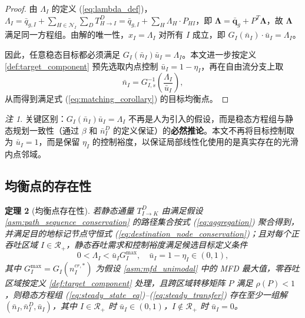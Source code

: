 \documentclass[a4paper,12pt]{article}
\theoremstyle{plain}
\newtheorem{theorem}{定理}[section]
\theoremstyle{definition}
\theoremstyle{remark}
\newtheorem{remark}[theorem]{注}
\begin{document}
\begin{proof}
由 $\Lambda_I$ 的定义 (\ref{eq:lambda_def})，$\Lambda_I = \bar{q}_{g,I} + \sum_{H\in\mathcal N_I} \sum_D T_{H \to I}^D = \bar{q}_{g,I} + \sum_H \Lambda_H \cdot P_{HI}$，即 $\bm{\Lambda} = \bar{\bm{q}}_g + P^T \bm{\Lambda}$，故 $\bm{\Lambda}$ 满足同一方程组。由解的唯一性，$x_I = \Lambda_I$ 对所有 $I$ 成立，即 $G_I(\bar{n}_I) \cdot \bar{u}_I = \Lambda_I$。

因此，任意稳态目标都必须满足 $G_I(\bar n_I)\bar u_I=\Lambda_I$。本文进一步按定义 \ref{def:target_component} 预先选取内点控制 $\bar u_I=1-\eta_I$，再在自由流分支上取
\begin{equation}
    \bar n_I=G_{I,s}^{-1}\left(\frac{\Lambda_I}{\bar u_I}\right),
\end{equation}
从而得到满足式 (\ref{eq:matching_corollary}) 的目标均衡点。
\end{proof}

\begin{remark}
关键区别：$G_I(\bar{n}_I)\bar u_I = \Lambda_I$ 不再是人为引入的假设，而是稳态方程组与静态规划一致性（通过 $\beta$ 和 $\bar{n}_I^D$ 的定义保证）的\textbf{必然推论}。本文不再将目标控制取为 $\bar u_I=1$，而是保留 $\eta_I$ 的控制裕度，以保证局部线性化使用的是真实存在的光滑内点邻域。
\end{remark}

\subsection{均衡点的存在性}

\begin{theorem}[均衡点存在性]\label{thm:equilibrium_existence}
若静态通量 $T_{I\to K}^D$ 由满足假设 \ref{asm:path_sequence_conservation} 的路径集合按式 (\ref{eq:aggregation}) 聚合得到，并满足目的地标记节点守恒式 (\ref{eq:destination_node_conservation})；且对每个正吞吐区域 $I \in \mathcal{R}_+$，静态吞吐需求和控制裕度满足候选目标定义条件
\begin{equation}\label{eq:margin_feasibility}
    0<\Lambda_I < \bar u_I G_I^{\max},
    \quad \bar u_I=1-\eta_I\in(0,1),
\end{equation}
其中 $G_I^{\max} = G_I(n_I^{cr,*})$ 为假设 \ref{asm:mfd_unimodal} 中的 MFD 最大值，零吞吐区域按定义 \ref{def:target_component} 处理，且跨区域转移矩阵 $P$ 满足 $\rho(P)<1$，则稳态方程组 (\ref{eq:steady_state_eq})--(\ref{eq:steady_transfer}) 存在至少一组解 $(\bar{n}_I, \bar{n}_I^D, \bar{u}_I)$，其中 $I\in\mathcal R_+$ 时 $\bar{u}_I \in (0,1)$，$I\notin\mathcal R_+$ 时 $\bar u_I=0$。
\end{theorem}
\end{document}
